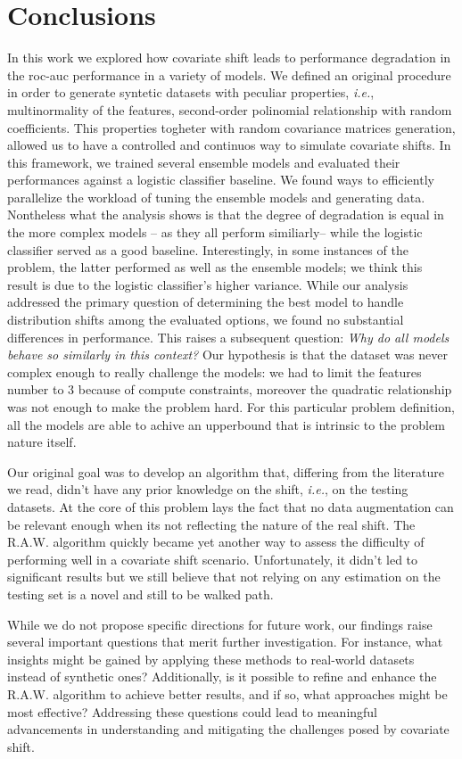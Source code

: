 \chapter{Conclusions}

In this work we explored how covariate shift leads to performance degradation in the roc-auc performance in a variety of models. We defined an original procedure in order to generate syntetic datasets with peculiar properties, \textit{i.e.}, multinormality of the features, second-order polinomial relationship with random coefficients. This properties togheter with random covariance matrices generation, allowed us to have a controlled and continuos way to simulate covariate shifts. In this framework, we trained several ensemble models and evaluated their performances against a logistic classifier baseline. We found ways to efficiently parallelize the workload of tuning the ensemble models and generating data. Nontheless what the analysis shows is that the degree of degradation is equal in the more complex models -- as they all perform similiarly-- while the logistic classifier served as a good baseline. Interestingly, in some instances of the problem, the latter performed as well as the ensemble models; we think this result is due to the logistic classifier's higher variance. While our analysis addressed the primary question of determining the best model to handle distribution shifts among the evaluated options, we found no substantial differences in performance. This raises a subsequent question: \textit{Why do all models behave so similarly in this context?} Our hypothesis is that the dataset was never complex enough to really challenge the models: we had to limit the features number to 3 because of compute constraints, moreover the quadratic relationship was not enough to make the problem hard. For this particular problem definition, all the models are able to achive an {upperbound} that is intrinsic to the problem nature itself. 

Our original goal was to develop an algorithm that, differing from the literature we read, didn't have any prior knowledge on the shift, \textit{i.e.}, on the testing datasets. At the core of this problem lays the fact that no data augmentation can be relevant enough when its not reflecting the nature of the real shift. The R.A.W. algorithm quickly became yet another way to assess the difficulty of performing well in a covariate shift scenario. Unfortunately, it didn't led to significant results but we still believe that not relying on any estimation on the testing set is a novel and still to be walked path.

While we do not propose specific directions for future work, our findings raise several important questions that merit further investigation. For instance, what insights might be gained by applying these methods to real-world datasets instead of synthetic ones? Additionally, is it possible to refine and enhance the R.A.W. algorithm to achieve better results, and if so, what approaches might be most effective? Addressing these questions could lead to meaningful advancements in understanding and mitigating the challenges posed by covariate shift.
